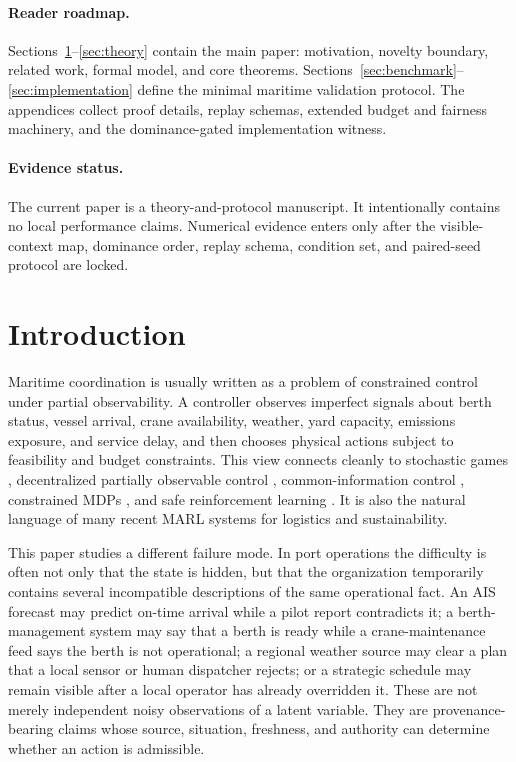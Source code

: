 \documentclass[11pt]{article}
\newcommand{\1}{\mathbf{1}}
\theoremstyle{definition}
\theoremstyle{plain}
\theoremstyle{remark}
\begin{document}
\paragraph{Reader roadmap.} Sections~\ref{sec:introduction}--\ref{sec:theory} contain the main paper: motivation, novelty boundary, related work, formal model, and core theorems. Sections~\ref{sec:benchmark}--\ref{sec:implementation} define the minimal maritime validation protocol. The appendices collect proof details, replay schemas, extended budget and fairness machinery, and the dominance-gated implementation witness.

\paragraph{Evidence status.} The current paper is a theory-and-protocol manuscript. It intentionally contains no local performance claims. Numerical evidence enters only after the visible-context map, dominance order, replay schema, condition set, and paired-seed protocol are locked.


\section{Introduction}
\label{sec:introduction}

Maritime coordination is usually written as a problem of constrained control under partial observability. A controller observes imperfect signals about berth status, vessel arrival, crane availability, weather, yard capacity, emissions exposure, and service delay, and then chooses physical actions subject to feasibility and budget constraints. This view connects cleanly to stochastic games \citep{Shapley1953,Littman1994}, decentralized partially observable control \citep{Bernstein2002,OliehoekAmato2016}, common-information control \citep{Nayyar2013}, constrained MDPs \citep{Altman1999}, and safe reinforcement learning \citep{GarciaFernandez2015,Achiam2017,Alshiekh2018}. It is also the natural language of many recent MARL systems for logistics and sustainability.

This paper studies a different failure mode. In port operations the difficulty is often not only that the state is hidden, but that the organization temporarily contains several incompatible descriptions of the same operational fact. An AIS forecast may predict on-time arrival while a pilot report contradicts it; a berth-management system may say that a berth is ready while a crane-maintenance feed says the berth is not operational; a regional weather source may clear a plan that a local sensor or human dispatcher rejects; or a strategic schedule may remain visible after a local operator has already overridden it. These are not merely independent noisy observations of a latent variable. They are provenance-bearing claims whose source, situation, freshness, and authority can determine whether an action is admissible.
\end{document}

